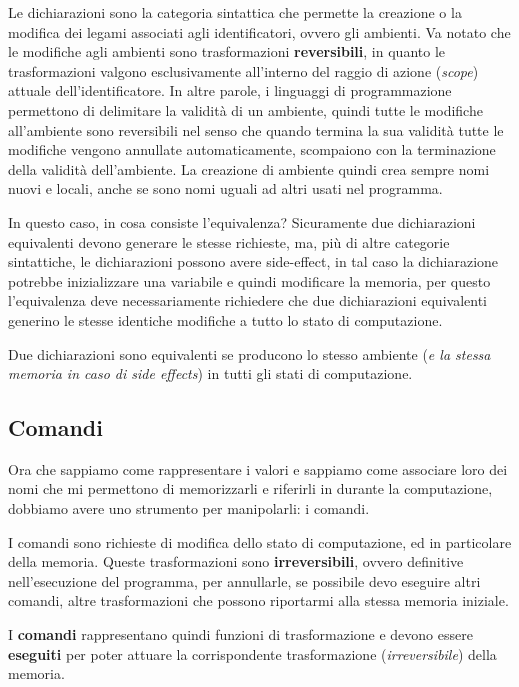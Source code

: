 \documentclass[oneside,a4paper,11pt]{book}
\theoremstyle{italicstyle}
\theoremstyle{normStyle}
\begin{document}
Le dichiarazioni
sono la categoria sintattica che permette la creazione o la modifica
dei legami associati agli identificatori, ovvero gli ambienti.
Va notato che le modifiche agli ambienti sono trasformazioni \textbf{reversibili},
in quanto le trasformazioni valgono esclusivamente all’interno del raggio
di azione (\textit{scope}) attuale dell’identificatore. In altre parole,
i linguaggi di programmazione permettono di delimitare la validità di
un ambiente, quindi tutte le modifiche all’ambiente sono reversibili
nel senso che quando termina la sua validità tutte le modifiche vengono
annullate automaticamente, scompaiono con la terminazione della validità
dell'ambiente. La creazione di ambiente quindi crea sempre nomi nuovi e
locali, anche se sono nomi uguali ad altri usati nel programma.

In questo caso, in cosa consiste l’equivalenza? Sicuramente due dichiarazioni
equivalenti devono generare le stesse richieste, ma,
più di altre categorie sintattiche, le dichiarazioni possono avere
side-effect, in tal caso la dichiarazione potrebbe inizializzare una variabile
e quindi modificare la memoria, per questo l’equivalenza deve necessariamente
richiedere che due dichiarazioni equivalenti generino le stesse identiche modifiche
a tutto lo stato di computazione.
\begin{tcolorbox}[title={Equivalenza}]
Due dichiarazioni sono equivalenti se producono lo stesso ambiente
(\textit{e la stessa memoria in caso di side effects})
in tutti gli stati di computazione.
\end{tcolorbox}
\subsection{Comandi}
Ora che sappiamo come rappresentare i valori e sappiamo come associare loro
dei nomi che mi permettono di memorizzarli e riferirli in durante la computazione,
dobbiamo avere uno strumento per manipolarli: i comandi.

I comandi sono richieste di modifica dello stato di computazione,
ed in particolare della memoria. Queste trasformazioni sono \textbf{irreversibili},
ovvero definitive nell’esecuzione del programma, per annullarle, se possibile
devo eseguire altri comandi, altre trasformazioni che possono riportarmi alla
stessa memoria iniziale.

I \textbf{comandi} rappresentano quindi funzioni di trasformazione
e devono essere \textbf{eseguiti} per poter attuare la corrispondente trasformazione
(\textit{irreversibile}) della memoria.
\end{document}
